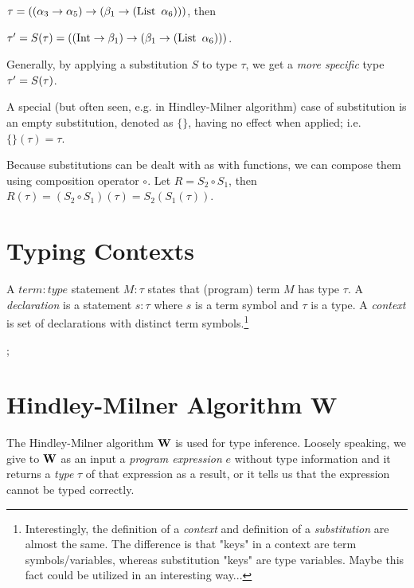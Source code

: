\documentclass[a4paper,oneside]{memoir}
\begin{document}
$\tau = ((\alpha_3 \rightarrow \alpha_5) \rightarrow ( \beta_1  \rightarrow (\operatorname{List}~\alpha_6) ) )$,
then 

$\tau^\prime = S(\tau) = ((\operatorname{Int} \rightarrow \beta_1) \rightarrow (\beta_1  \rightarrow (\operatorname{List}~\alpha_6) ) )$.

Generally, by applying a substitution $S$ to type $\tau$, we get a \textit{more specific} type $\tau^\prime = S(\tau)$.

A special (but often seen, e.g. in Hindley-Milner algorithm) case of substitution is an
empty substitution, denoted as $\{\}$, having no effect when applied; 
i.e. $\{\}(\tau) = \tau$.


Because substitutions can be dealt with as with functions, we can compose them using composition operator $\circ$. Let $R = S_2 \circ S_1$, then 
$R(\tau) = (S_2 \circ S_1)(\tau) = S_2 ( S_1(\tau) )$. 



\section{Typing Contexts}

\begin{definition}
A $\mathit{term:type}$ statement $\mathit{M}:\mathit{\tau}$ states that (program) term $M$ has type $\tau$.   
A \textit{declaration} is a statement $s : \tau$ where $s$ is a term symbol and $\tau$ is a type.
A \textit{context} is set of declarations with distinct term symbols.\footnote{Interestingly, the definition of a \textit{context} and definition of a \textit{substitution} are almost the same. The difference is that "keys" in a context are term symbols/variables, whereas substitution "keys" are type variables. Maybe this fact could be utilized in an interesting way...}
\end{definition}

 ; 



\section{Hindley-Milner Algorithm W}

The Hindley-Milner algorithm $\operatorname{\textbf{W}}$ is used for type inference.
Loosely speaking, we give to $\operatorname{\textbf{W}}$ as an input 
a \textit{program expression} $e$ without type information 
and it returns a \textit{type} $\tau$ of that expression as a result, 
or it tells us that the expression cannot be typed correctly.
\end{document}
